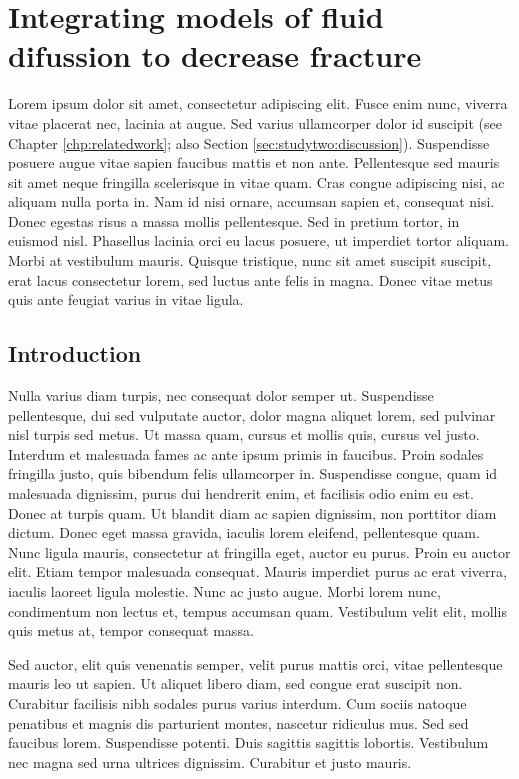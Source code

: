 \chapter[Integration of fracture models]{Integrating models of fluid difussion to decrease fracture}
\label{chp:studythree}

Lorem ipsum dolor sit amet, consectetur adipiscing elit. Fusce enim nunc,
viverra vitae placerat nec, lacinia at augue.  Sed varius ullamcorper dolor
id suscipit (see Chapter \ref{chp:relatedwork}; also Section
\ref{sec:studytwo:discussion}).  Suspendisse posuere augue vitae sapien
faucibus mattis et non ante.  Pellentesque sed mauris sit amet neque
fringilla scelerisque in vitae quam.  Cras congue adipiscing nisi, ac
aliquam nulla porta in.  Nam id nisi ornare, accumsan sapien et, consequat
nisi.  Donec egestas risus a massa mollis pellentesque.  Sed in pretium
tortor, in euismod nisl.  Phasellus lacinia orci eu lacus posuere, ut
imperdiet tortor aliquam.  Morbi at vestibulum mauris.  Quisque tristique,
nunc sit amet suscipit suscipit, erat lacus consectetur lorem, sed luctus
ante felis in magna.  Donec vitae metus quis ante feugiat varius in vitae
ligula.

\section{Introduction}
\label{sec:studythree:intro}

Nulla varius diam turpis, nec consequat dolor semper ut. Suspendisse
pellentesque, dui sed vulputate auctor, dolor magna aliquet lorem, sed
pulvinar nisl turpis sed metus.  Ut massa quam, cursus et mollis quis,
cursus vel justo.  Interdum et malesuada fames ac ante ipsum primis in
faucibus.  Proin sodales fringilla justo, quis bibendum felis ullamcorper
in.  Suspendisse congue, quam id malesuada dignissim, purus dui hendrerit
enim, et facilisis odio enim eu est.  Donec at turpis quam.  Ut blandit diam
ac sapien dignissim, non porttitor diam dictum.  Donec eget massa gravida,
iaculis lorem eleifend, pellentesque quam.  Nunc ligula mauris, consectetur
at fringilla eget, auctor eu purus.  Proin eu auctor elit.  Etiam tempor
malesuada consequat.  Mauris imperdiet purus ac erat viverra, iaculis
laoreet ligula molestie.  Nunc ac justo augue.  Morbi lorem nunc,
condimentum non lectus et, tempus accumsan quam.  Vestibulum velit elit,
mollis quis metus at, tempor consequat massa.

Sed auctor, elit quis venenatis semper, velit purus mattis orci, vitae
pellentesque mauris leo ut sapien.  Ut aliquet libero diam, sed congue erat
suscipit non.  Curabitur facilisis nibh sodales purus varius interdum.  Cum
sociis natoque penatibus et magnis dis parturient montes, nascetur ridiculus
mus.  Sed sed faucibus lorem.  Suspendisse potenti.  Duis sagittis sagittis
lobortis.  Vestibulum nec magna sed urna ultrices dignissim.  Curabitur et
justo mauris.

